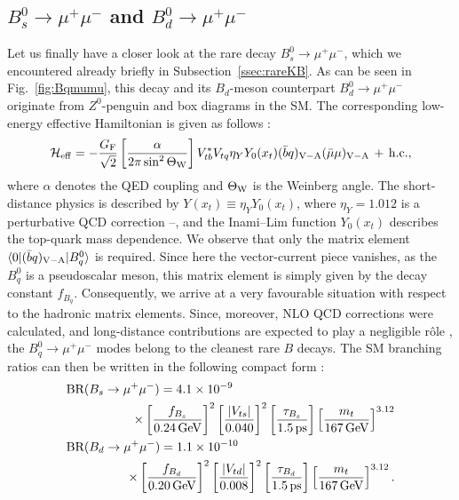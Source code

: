 \documentclass[11pt]{cernrep}
\begin{document}
\subsection{$B^0_s\to\mu^+\mu^-$ and $B^0_d\to\mu^+\mu^-$}\label{ssec:Bmumu}
\unboldmath
%
%
%
Let us finally have a closer look at the rare decay $B^0_s\to\mu^+\mu^-$,
which we encountered already briefly in Subsection~\ref{ssec:rareKB}. 
As can be seen in Fig.~\ref{fig:Bqmumu}, this decay and its $B_d$-meson
counterpart $B^0_d\to\mu^+\mu^-$ originate from $Z^0$-penguin and
box diagrams in the SM. The corresponding low-energy effective Hamiltonian 
is given as follows \cite{B-LH98}:
\begin{equation}\label{Heff-Bmumu}
{\cal H}_{\rm eff}=-\frac{G_{\rm F}}{\sqrt{2}}\left[
\frac{\alpha}{2\pi\sin^2\Theta_{\rm W}}\right]
V_{tb}^\ast V_{tq} \eta_Y Y_0(x_t)(\bar b q)_{\rm V-A}(\bar\mu\mu)_{\rm V-A} 
\,+\, {\rm h.c.},
\end{equation}
where $\alpha$ denotes the QED coupling and $\Theta_{\rm W}$ is the
Weinberg angle. The short-distance physics is described by 
$Y(x_t)\equiv\eta_Y Y_0(x_t)$, where $\eta_Y=1.012$ is a perturbative 
QCD correction \cite{BB-Bmumu}--\cite{MiU}, and the Inami--Lim function
$Y_0(x_t)$ describes the top-quark mass dependence. We observe that
only the matrix element $\langle 0| (\bar b q)_{\rm V-A}|B^0_q\rangle$ 
is required. Since here the vector-current piece vanishes, as
the $B^0_q$ is a pseudoscalar meson, this matrix element is simply
given by the decay constant $f_{B_q}$. 
Consequently, we arrive at a very favourable 
situation with respect to the hadronic matrix elements. Since, moreover, 
NLO QCD corrections were calculated, and long-distance contributions are 
expected to play a negligible r\^ole \cite{BB-Bmumu}, the $B^0_q\to\mu^+\mu^-$ 
modes belong to the cleanest rare $B$ decays. The SM branching ratios
can then be written in the following compact form \cite{Brev01}:
\begin{eqnarray}
\lefteqn{\mbox{BR}( B_s \to \mu^+ \mu^-) = 4.1 \times 10^{-9}}\nonumber\\
&&\qquad\qquad\times \left[\frac{f_{B_s}}{0.24 \, \mbox{GeV}} \right]^2 \left[
\frac{|V_{ts}|}{0.040} \right]^2 \left[
\frac{\tau_{B_s}}{1.5 \, \mbox{ps}} \right] \left[ \frac{m_t}{167 
\, \mbox{GeV} } \right]^{3.12}\label{BR-Bsmumu}\\
\lefteqn{\mbox{BR}(B_d \to \mu^+ \mu^-) = 1.1 \times 10^{-10}}\nonumber\\
&&\qquad\qquad\times\left[ \frac{f_{B_d}}{0.20 \, \mbox{GeV}} \right]^2 \left[
\frac{|V_{td}|}{0.008} \right]^2
\left[ \frac{\tau_{B_d}}{1.5 \, \mbox{ps}} \right] \left[
\frac{m_t}{167 \, \mbox{GeV} } \right]^{3.12}.\label{BR-Bdmumu}
\end{eqnarray}
\end{document}
